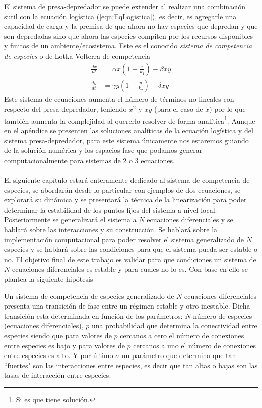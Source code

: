 El sistema de presa-depredador se puede extender al realizar una combinación sutil con la ecuación logística (\ref{eqn:EqLogistica}), es decir, es agregarle una capacidad de carga y la premisa de que ahora no hay especies que depredan y que son depredadas sino que ahora las especies compiten por los recursos disponibles y finitos de un ambiente/ecosistema. Este es el conocido \textit{sistema de competencia de especies} o de Lotka-Volterra de competencia
\begin{equation}\label{eqn:CompentenciaEspecies2x2}
	\begin{split}
		\frac{dx}{dt} &= \alpha x\left (1-\frac{x}{k_1}\right )-\beta xy\\
		\frac{dy}{dt} &= \gamma y\left (1-\frac{y}{k_2}\right )-\delta xy
	\end{split}
\end{equation}
Este sistema de ecuaciones aumenta el número de términos no lineales con respecto del presa depredador, teniendo $x^2$ y $xy$ (para el caso de $\dot{x}$) por lo que también aumenta la complejidad al quererlo resolver de forma analítica\footnote{Si es que tiene solución.}. Aunque en el apéndice se presenten las soluciones analíticas de la ecuación logística y del sistema presa-depredador, para este sistema únicamente nos estaremos guiando de la solución numérica y los espacios fase que podamos generar computacionalmente para sistemas de 2 o 3 ecuaciones.\\
\\
El siguiente capítulo estará enteramente dedicado al sistema de competencia de especies, se abordarán desde lo particular con ejemplos de dos ecuaciones, se explorará su dinámica y se presentará la técnica de la linearización para poder determinar la estabilidad de los puntos fijos del sistema a nivel local. Posteriormente se generalizará el sistema a $N$ ecuaciones diferenciales y se hablará sobre las interacciones y su construcción. Se hablará sobre la implementación computacional para poder resolver el sistema generalizado de $N$ especies y se hablará sobre las condiciones para que el sistema pueda ser estable o no. El objetivo final de este trabajo es validar para que condiciones un sistema de $N$ ecuaciones diferenciales es estable y para cuales no lo es. Con base en ello se plantea la siguiente hipótesis
\newpage
\begin{proposición}
	Un sistema de competencia de especies generalizado de $N$ ecuaciones diferenciales presenta una transición de fase entre un régimen estable y otro inestable. Dicha transición esta determinada en función de los parámetros: $N$ número de especies (ecuaciones diferenciales), $p$ una probabilidad que determina la conectividad entre especies siendo que para valores de $p$ cercanos a cero el número de conexiones entre especies es bajo y para valores de $p$ cercanos a uno el número de conexiones entre especies es alto. Y por último $\sigma$ un parámetro que determina que tan ``fuertes" son las interacciones entre especies, es decir que tan altas o bajas son las tasas de interacción entre especies. 
\end{proposición}

